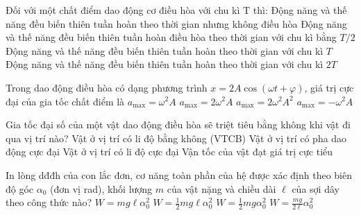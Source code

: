 \begin{ex}%
	Đối với một chất điểm dao động cơ điều hòa với chu kì T thì:
	\choice
	{Động năng và thế năng đều biến thiên tuần hoàn theo thời gian nhưng không điều hòa}
	{\True Động năng và thế năng đều biến thiên tuần hoàn điều hòa theo thời gian với chu kì bằng $T/2$}
	{Động năng và thế năng đều biến thiên tuần hoàn theo thời gian với chu kì $T$}
	{Động năng và thế năng đều biến thiên tuần hoàn theo thời gian với chu kì $2T$}
\end{ex}

\begin{ex}%
	Trong dao động điều hòa có dạng phương trình $x=2A \cos (\omega t+\varphi)$, giá trị cực đại của gia tốc chất điểm là
	\choice
	{$a_{\max }=\omega^{2}A$}
	{\True $a_{\max }=2\omega^{2}A$}
	{$a_{\max }=2\omega^{2}A^{2}$}
	{$a_{\max }=-\omega^{2}A$}
\end{ex}

\begin{ex}%
	Gia tốc đại số của một vật dao động điều hòa sẽ triệt tiêu bằng không khi vật đi qua vị trí nào?
	\choice
	{\True Vật ở vị trí có li độ bằng không (VTCB)}
	{Vật ở vị trí có pha dao động cực đại}
	{Vật ở vị trí có li độ cực đại}
	{Vận tốc của vật đạt giá trị cực tiểu}
\end{ex}

\begin{ex}%
	In lòng dđđh của con lắc đơn, cơ năng toàn phần của hệ được xác định theo biên độ góc $\alpha_{0}$ (đơn vị rad), khối lượng $m$ của vật nặng và chiều dài $\ell$ của sợi dây theo công thức nào?
	\choice
	{$W=mg\ell\alpha_{0}^{2}$}
	{\True $W=\frac{1}{2}mg\ell\alpha_{0}^{2}$}
	{$W=\frac{1}{2}mg\alpha_{0}^{2}$}
	{$W=\frac{mg}{2\ell}\alpha_{0}^{2}$}
\end{ex}


